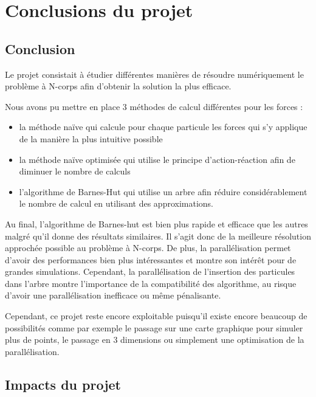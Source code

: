 \chapter{Conclusions du projet}

\section{Conclusion}

Le projet consistait à étudier différentes manières de résoudre numériquement le problème à N-corps afin d'obtenir la solution la plus efficace.

Nous avons pu mettre en place $3$ méthodes de calcul différentes pour les forces :

\begin{itemize}
\item la méthode naïve qui calcule pour chaque particule les forces qui s'y applique de la manière la plus intuitive possible

\item la méthode naïve optimisée qui utilise le principe d'action-réaction afin de diminuer le nombre de calculs

\item l'algorithme de Barnes-Hut qui utilise un arbre afin réduire considérablement le nombre de calcul en utilisant des approximations.

\end{itemize}


Au final, l'algorithme de Barnes-hut est bien plus rapide et efficace que les autres malgré qu'il donne des résultats similaires. Il s'agit donc de la meilleure résolution approchée possible au problème à N-corps. De plus, la parallélisation permet d'avoir des performances bien plus intéressantes et montre son intérêt pour de grandes simulations. Cependant, la parallélisation de l'insertion des particules dans l'arbre montre l'importance de la compatibilité des algorithme, au risque d'avoir une parallélisation inefficace ou même pénalisante.

Cependant, ce projet reste encore exploitable puisqu'il existe encore beaucoup de possibilités comme par exemple le passage sur une carte graphique pour simuler plus de points, le passage en 3 dimensions ou simplement une optimisation de la parallélisation.

\section{Impacts du projet}

